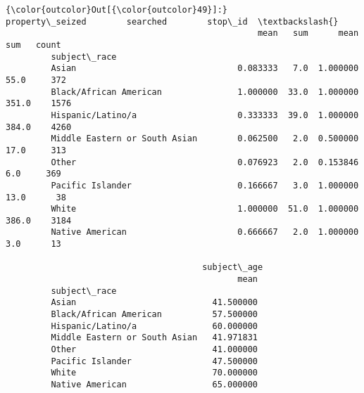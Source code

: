 \documentclass[11pt]{article}
\begin{document}
\begin{Verbatim}[commandchars=\\\{\}]
{\color{outcolor}Out[{\color{outcolor}49}]:}                               property\_seized        searched        stop\_id  \textbackslash{}
                                                  mean   sum      mean    sum   count   
         subject\_race                                                                   
         Asian                                0.083333   7.0  1.000000   55.0     372   
         Black/African American               1.000000  33.0  1.000000  351.0    1576   
         Hispanic/Latino/a                    0.333333  39.0  1.000000  384.0    4260   
         Middle Eastern or South Asian        0.062500   2.0  0.500000   17.0     313   
         Other                                0.076923   2.0  0.153846    6.0     369   
         Pacific Islander                     0.166667   3.0  1.000000   13.0      38   
         White                                1.000000  51.0  1.000000  386.0    3184   
         Native American                      0.666667   2.0  1.000000    3.0      13   
         
                                       subject\_age  
                                              mean  
         subject\_race                               
         Asian                           41.500000  
         Black/African American          57.500000  
         Hispanic/Latino/a               60.000000  
         Middle Eastern or South Asian   41.971831  
         Other                           41.000000  
         Pacific Islander                47.500000  
         White                           70.000000  
         Native American                 65.000000  
\end{Verbatim}
            
\end{document}
